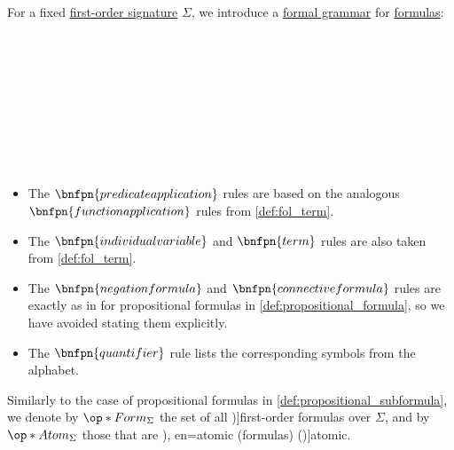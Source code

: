 \begin{definition}\label{def:fol_formula}\mimprovised
  For a fixed \hyperref[def:fol_signature]{first-order signature} \( \Sigma \), we introduce a \hyperref[def:formal_grammar]{formal grammar} for \hyperref[con:proposition]{formulas}:
  \begin{longbnf*}
           {\bnftsq{(} \bnfsp {} \bnfsp \bnftsq{\( \syneq \)} \bnfsp {} \bnfsp \bnftsq{)}} \\
         { \bnfsp {} \bnfsp {} \bnfsp {}} \\
             { \bnfor} \\
     \\
     \\
                    { \bnfor} \\
     \\
     \\
  \end{longbnf*}

  \begin{itemize}
    \item The \( \bnfpn{predicate application} \) rules are based on the analogous \( \bnfpn{function application} \) rules from \cref{def:fol_term}.

    \item The \( \bnfpn{individual variable} \) and \( \bnfpn{term} \) rules are also taken from \cref{def:fol_term}.

    \item The \( \bnfpn{negation formula} \) and \( \bnfpn{connective formula} \) rules are exactly as in for propositional formulas in \cref{def:propositional_formula}, so we have avoided stating them explicitly.

    \item The \( \bnfpn{quantifier} \) rule lists the corresponding symbols from the alphabet.
  \end{itemize}

  Similarly to the case of propositional formulas in \cref{def:propositional_subformula}, we denote by \( \op*{Form}_\Sigma \) the set of all \term[en=first-order formulas (\cite[23]{CitkinMuravitsky2022ConsequenceRelations})]{first-order formulas} over \( \Sigma \), and by \( \op*{Atom}_\Sigma \) those that are \term[ru=атомарные (формулы) (\cite[56]{КолмогоровДрагалин2006ЛогикаВведение}), en=atomic (formulas) (\cite[def. 2.1.8]{Hinman2005Logic})]{atomic}.
\end{definition}

